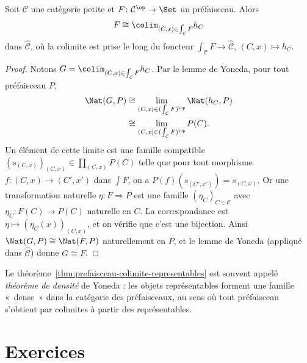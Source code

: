 \begin{theoreme}%
\label{thm:prefaisceau-colimite-representables}
Soit $\mathcal{C}$ une catégorie petite et
$F \colon \mathcal{C}^{\op} \to \Set$ un préfaisceau. Alors
\[
    F \cong \colim_{(C, x) \in \int_{\mathcal{C}} F} h_C
\]
dans $\widehat{\mathcal{C}}$, où la colimite est prise le long du
foncteur $\int_{\mathcal{C}} F \to \widehat{\mathcal{C}}$,
$(C, x) \mapsto h_C$.
\end{theoreme}

\begin{proof}
Notons $G = \colim_{(C,x) \in \int_{\mathcal{C}} F} h_C$.
Par le lemme de Yoneda, pour tout préfaisceau $P$,
\begin{align*}
    \Nat(G, P)
    &\cong \lim_{(C,x) \in (\int_{\mathcal{C}} F)^{\op}} \Nat(h_C, P) \\
    &\cong \lim_{(C,x) \in (\int_{\mathcal{C}} F)^{\op}} P(C).
\end{align*}
Un élément de cette limite est une famille compatible
$(s_{(C,x)})_{(C,x)} \in \prod_{(C,x)} P(C)$ telle que
pour tout morphisme $f \colon (C,x) \to (C', x')$ dans $\int F$,
on a $P(f)(s_{(C',x')}) = s_{(C,x)}$.
Or une transformation naturelle $\eta \colon F \Rightarrow P$ est
une famille $(\eta_C)_{C \in \mathcal{C}}$ avec
$\eta_C \colon F(C) \to P(C)$ naturelle en $C$.
La correspondance est $\eta \mapsto (\eta_C(x))_{(C,x)}$,
et on vérifie que c'est une bijection. Ainsi
$\Nat(G, P) \cong \Nat(F, P)$ naturellement en $P$,
et le lemme de Yoneda (appliqué dans $\widehat{\mathcal{C}}$)
donne $G \cong F$.
\end{proof}

\begin{remarque}\label{rem:colimite-representables-densite}
Le théorème~\ref{thm:prefaisceau-colimite-representables} est souvent
appelé \emph{théorème de densité} de Yoneda : les objets représentables
forment une famille «~dense~» dans la catégorie des préfaisceaux, au sens
où tout préfaisceau s'obtient par colimites à partir des représentables.
\end{remarque}


\section{Exercices}\label{sec:exo-yoneda}

